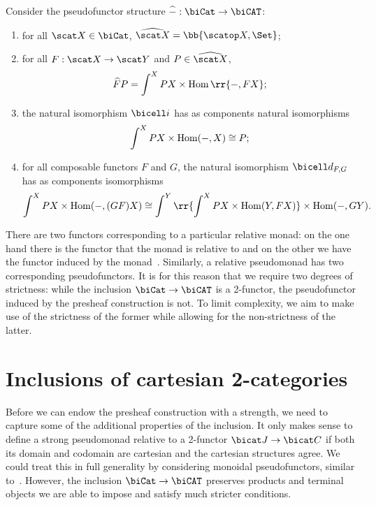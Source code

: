 \begin{example}\label{ex:presheaf_pseudofunctor}
  Consider the pseudofunctor structure $\widehat{-} : \biCat\to\biCAT$:
  \begin{enumerate}
    \item for all $\scat X\in\biCat$, $\widehat{\scat X}=\bb{\scatop X,\Set}$;
    \item for all $F:\scat X\to\scat Y$ and $P\in\widehat{\scat X}$,
      \begin{align*}
        \widehat{F}P = \int^X PX\times\Hom\rr{-,FX};
      \end{align*}
    \item the natural isomorphism $\bicell i$ has as components natural isomorphisms
      \begin{align*}
        \int^X PX\times\operatorname{Hom}(-,X) \cong P;
      \end{align*}
    \item for all composable functors $F$ and $G$, the natural isomorphism $\bicell d_{F,G}$
      has as components isomorphisms
      \begin{align*}
        \int^X PX\times\Hom(-,(GF)X) \cong \int^Y\rr{\int^X PX\times\Hom(Y,FX)}\times\Hom(-,GY).
      \end{align*}
  \end{enumerate}
\end{example}

There are two functors corresponding to a particular relative monad: on the one
hand there is the functor that the monad is relative to and on the other we
have the functor induced by the monad~\cite{altenkirch2015}. Similarly, a
relative pseudomonad has two corresponding pseudofunctors. It is for this
reason that we require two degrees of strictness: while the inclusion
$\biCat\to\biCAT$ is a 2-functor, the pseudofunctor induced by the presheaf
construction is not. To limit complexity, we aim to make use of the strictness
of the former while allowing for the non-strictness of the latter.

\section{Inclusions of cartesian 2-categories}

Before we can endow the presheaf construction with a strength, we need to
capture some of the additional properties of the inclusion. It only makes sense
to define a strong pseudomonad relative to a 2-functor $\bicat J\to\bicat C$ if
both its domain and codomain are cartesian and the cartesian structures agree.
We could treat this in full generality by considering monoidal pseudofunctors,
similar to~\cite{tarmo}. However, the inclusion $\biCat\to\biCAT$ preserves
products and terminal objects we are able to impose and satisfy much stricter
conditions.

